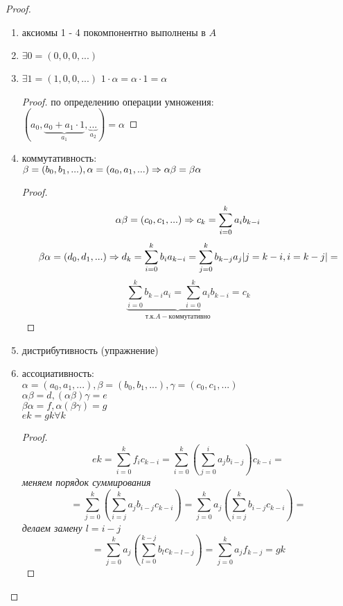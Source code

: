 	\begin{proof}
		\begin{enumerate}
			\item аксиомы 1 - 4 покомпонентно выполнены в $A$
			\item $\exists 0 = (0, 0, 0, ...)$
			\item $\exists 1 = (1, 0, 0, ...)$ 
				$ 1 \cdot \alpha = \alpha \cdot 1 = \alpha $
			\begin{proof}
				по определению операции умножения:\\
				$ (a_0, \underbrace{a_0 + a_1 \cdot 1}_{a_1}, \underbrace{...}_{a_2}) = \alpha $
			\end{proof}
			\item коммутативность:\\
			$\beta = (b_0, b_1, ...), \alpha = (a_0, a_1, ...) \Rightarrow \alpha\beta = \beta\alpha$
			\begin{proof}
				$$ \alpha\beta = (c_0, c_1, ...) \Rightarrow c_k = \sum_{i = 0}^k a_ib_{k - i} $$
				$$ \beta\alpha = (d_0, d_1, ...) \Rightarrow d_k = \sum_{i = 0}^k b_ia_{k - i} = \sum_{j = 0}^k b_{k - j}a_j
				|j = k - i, i = k - j| =$$
				$$ \underbrace{\sum_{i = 0}^k b_{k - i}a_i  = \sum_{i = 0}^k a_ib_{k - i}}_{т.к. A - коммутативно} = c_k $$
			\end{proof}
			\item дистрибутивность (упражнение)
			\item ассоциативность:\\
			$\alpha = (a_0, a_1, ...), \beta = (b_0, b_1, ...), \gamma = (c_0, c_1, ...)$\\
			$\alpha\beta = d, (\alpha\beta)\gamma = e$\\
			$\beta\alpha = f, \alpha(\beta\gamma) = g$\\
			$ek = gk \forall k$
			\begin{proof}
				$$ ek = \sum_{i = 0}^k f_ic_{k-i} = \sum_{i = 0}^k(\sum_{j = 0}^i a_jb_{i-j})c_{k-i} = $$
				\textit{меняем порядок суммирования}
				$$ = \sum_{j = 0}^k(\sum_{i = j}^k a_jb_{i - j}c_{k - i}) = \sum_{j = 0}^k a_j(\sum_{i = j}^k b_{i - j}c_{k - i}) = $$
				\textit{делаем замену $l = i - j$}
				$$ = \sum_{j = 0}^k a_j(\sum_{l = 0}^{k - j} b_lc_{k - l - j}) = \sum_{j = 0}^k a_jf_{k-j} = gk$$
			\end{proof}
		\end{enumerate}
	\end{proof}
